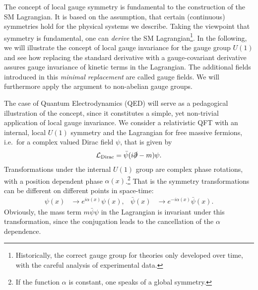 The concept of local gauge symmetry is fundamental to the construction
of the SM Lagrangian. It is based on the assumption, that
certain (continuous) symmetries hold for the physical systems we
describe. Taking the viewpoint that symmetry
is fundamental, one can \textit{derive} the SM Lagrangian\footnote{Historically, the correct gauge group for
  theories only developed over time, with the careful analysis of
  experimental data.}. In the following, we will
illustrate the concept of local gauge invariance for the gauge group
$U(1)$ and see how replacing
the standard derivative with a gauge-covariant derivative assures gauge invariance of kinetic terms in
the Lagrangian. The additional fields introduced in this \textit{minimal
  replacement} are called gauge fields. We will furthermore apply the argument to
non-abelian gauge groups.

\label{sec:qedu1}
\label{sec:ymlagrang}
The case of Quantum Electrodynamics (QED) will serve as a
pedagogical illustration of the concept, since it constitutes a
simple, yet non-trivial application of local gauge invariance. We consider a relativistic QFT with an internal, local $U(1)$ symmetry and
the Lagrangian for free massive fermions, i.e.\ for a complex valued Dirac field
$\psi$, that is given by
\begin{align}
  \mathcal{L}_{\text{Dirac}} = \bar{\psi}(i\slashed{\partial}-m)\psi.\label{eq:diraclag}
\end{align}
Transformations under the internal $U(1)$ group are complex phase
rotations, with a position dependent phase $\alpha(x)$.\footnote{If the
function $\alpha$ is constant, one speaks of a global symmetry.} That is the
symmetry transformations can be different on different points in space-time:
\begin{align}\label{eq:diractrafo}
  \psi(x) &\rightarrow e^{i\alpha(x)}\psi(x),&  \bar{\psi}(x) &\rightarrow e^{-i\alpha(x)}\bar{\psi}(x).
\end{align}
Obviously, the mass term $m\bar{\psi}\psi$ in
the Lagrangian is invariant under this transformation, since the conjugation leads to
the cancellation of the $\alpha$ dependence.

